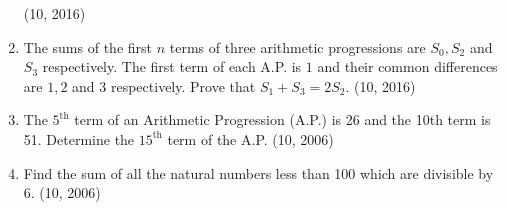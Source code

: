 \begin{enumerate}[label=\thesubsection.\arabic*,ref=\thesubsection.\theenumi,itemsep=1pt]
\hfill (10, 2016)
\item The sums of the first $n$ terms of three arithmetic progressions are $S_0, S_2$ and $S_3$ respectively. The first term of each A.P. is $1$ and their common differences are $1, 2$ and $3$ respectively. Prove that $S_1 + S_3 = 2S_2$.
								\hfill (10, 2016)
\item The $5^{\text{th}}$ term of an Arithmetic Progression (A.P.) is 26 and the 10th term is 51. Determine the $15^{\text{th}}$ term of the A.P.
    \hfill (10, 2006)
\item Find the sum of all the natural numbers less than 100 which are divisible by 6.
    \hfill (10, 2006)
\end{enumerate}

